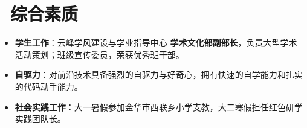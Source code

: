 \documentclass[11pt]{article}
\begin{document}
\section{\faInfoCircle\ 综合素质}
\begin{itemize}[nosep]
    \item \textbf{学生工作}：云峰学风建设与学业指导中心 \textbf{学术文化部副部长}，负责大型学术活动策划；班级宣传委员，荣获优秀班干部。
    \item \textbf{自驱力}：对前沿技术具备强烈的自驱力与好奇心，拥有快速的自学能力和扎实的代码动手能力。
    \item \textbf{社会实践工作}：大一暑假参加金华市西联乡小学支教，大二寒假担任红色研学实践团队长。
\end{itemize}
\end{document}
